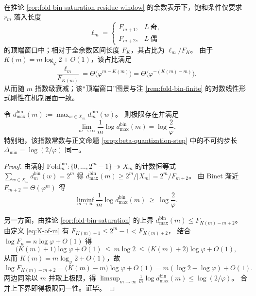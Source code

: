 \begin{corollary}[饱和窗口的相对尺度与指数衰减]\label{cor:fold-bin-saturation-window-density}
在推论 \ref{cor:fold-bin-saturation-residue-window} 的余数表示下，饱和条件仅要求 \(r_m\) 落入长度
\[
\ell_m=
\begin{cases}
F_{m+1},& L\ \text{奇},\\
F_{m+2},& L\ \text{偶}
\end{cases}
\]
的顶端窗口中；相对于全余数区间长度 \(F_K\)，其占比为 \(\ell_m/F_K\)。
由于 \(K(m)=m\log_{\varphi}2+O(1)\)，该占比满足
\[
\frac{\ell_m}{F_{K(m)}}=\Theta\!\bigl(\varphi^{m-K(m)}\bigr)=\Theta\!\bigl(\varphi^{-(K(m)-m)}\bigr),
\]
从而随 \(m\) 指数级衰减；该“顶端窗口”图景与注 \ref{rem:fold-bin-finite} 的对数线性形式刚性在机制层面一致。
\end{corollary}

\begin{theorem}\label{thm:fold-bin-max-fiber-exponent}
令 \(d^{\mathrm{bin}}_{\max}(m):=\max_{w\in X_m} d^{\mathrm{bin}}_m(w)\)。
则极限存在并满足
\[
\lim_{m\to\infty}\frac{1}{m}\log d^{\mathrm{bin}}_{\max}(m)=\log\frac{2}{\varphi}.
\]
特别地，该指数常数与正文命题 \ref{prop:beta-quantization-step} 中的不可约步长 \(\Delta_{\min}=\log(2/\varphi)\) 同一。
\end{theorem}
\begin{proof}
由满射 \(\mathrm{Fold}^{\mathrm{bin}}_m:\{0,\dots,2^m-1\}\twoheadrightarrow X_m\) 的计数恒等式
\(
\sum_{w\in X_m} d^{\mathrm{bin}}_m(w)=2^m
\)
得
\(
d^{\mathrm{bin}}_{\max}(m)\ge 2^m/|X_m|
=2^m/F_{m+2}
\)。
由 Binet 渐近 \(F_{m+2}=\Theta(\varphi^{m})\) 得
\[
\liminf_{m\to\infty}\frac{1}{m}\log d^{\mathrm{bin}}_{\max}(m)\ \ge\ \log\frac{2}{\varphi}.
\]
\par
另一方面，由推论 \ref{cor:fold-bin-saturation} 的上界
\(
d^{\mathrm{bin}}_{\max}(m)\le F_{K(m)-m+2}
\)。
由定义 \eqref{eq:K-of-m} 有
\(
F_{K(m)+1}\le 2^m-1 < F_{K(m)+2}
\)，
结合 \(\log F_n=n\log\varphi+O(1)\) 得
\[
\bigl(K(m)+1\bigr)\log\varphi+O(1)\ \le\ m\log 2\ \le\ \bigl(K(m)+2\bigr)\log\varphi+O(1),
\]
从而 \(K(m)=m\log_{\varphi}2+O(1)\)，故
\[
\log F_{K(m)-m+2}=\bigl(K(m)-m\bigr)\log\varphi+O(1)
=m(\log 2-\log\varphi)+O(1).
\]
两边同除以 \(m\) 并取上极限，得
\(
\limsup_{m\to\infty}\frac{1}{m}\log d^{\mathrm{bin}}_{\max}(m)\le \log(2/\varphi)
\)。
合并上下界即得极限同一性。证毕。
\end{proof}

